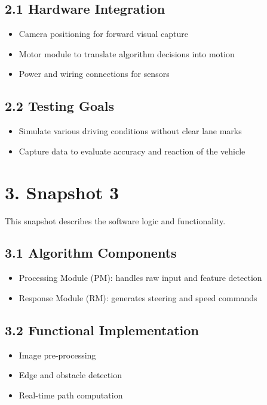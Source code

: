\documentclass[8pt]{article}
\begin{document}
\subsection*{2.1 Hardware Integration}
\begin{itemize}[label=\textbullet]
  \item Camera positioning for forward visual capture
  \item Motor module to translate algorithm decisions into motion
  \item Power and wiring connections for sensors
\end{itemize}

\subsection*{2.2 Testing Goals}
\begin{itemize}[label=\textbullet]
  \item Simulate various driving conditions without clear lane marks
  \item Capture data to evaluate accuracy and reaction of the vehicle
\end{itemize}

\section*{3. Snapshot 3}
This snapshot describes the software logic and functionality.

\subsection*{3.1 Algorithm Components}
\begin{itemize}[label=\textbullet]
  \item Processing Module (PM): handles raw input and feature detection
  \item Response Module (RM): generates steering and speed commands
\end{itemize}

\subsection*{3.2 Functional Implementation}
\begin{itemize}[label=\textbullet]
  \item Image pre-processing
  \item Edge and obstacle detection
  \item Real-time path computation
\end{itemize}
\end{document}
